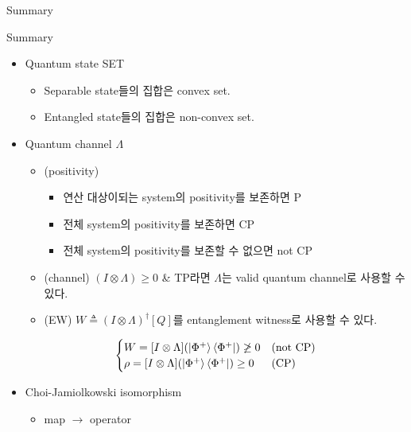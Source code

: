 \documentclass[9pt]{beamer}
\begin{document}
    \begin{frame}{Summary}
        \begin{block}{Summary}
            \begin{itemize}
                \item Quantum state SET 
                \begin{itemize}
                    \item Separable state들의 집합은 convex set.
                    \item Entangled state들의 집합은 non-convex set.
                \end{itemize}
                \item Quantum channel $\Lambda$
                \begin{itemize}
                    \item (positivity)
                    \begin{itemize}
                        \item 연산 대상이되는 system의 positivity를 보존하면 P
                        \item 전체 system의 positivity를 보존하면 CP
                        \item 전체 system의 positivity를 보존할 수 없으면 not CP
                    \end{itemize}
                    \item (channel) $(I \otimes \Lambda) \ge 0$ \& TP라면 $\Lambda$는 valid quantum channel로 사용할 수 있다.
                    \item (EW) $W \triangleq (I \otimes \Lambda)^\dagger [Q]$를 entanglement witness로 사용할 수 있다. 
                \end{itemize}
                \begin{equation*}
                    \begin{cases}
                        W = [I \otimes \Lambda] (\ket{\Phi^+} \bra{\Phi^+}) \not \ge 0 &\text{(not CP)} \\
                        \rho = [I \otimes \Lambda] (\ket{\Phi^+} \bra{\Phi^+}) \ge 0 &\text{(CP)}
                    \end{cases}
                \end{equation*}
            \item Choi-Jamiolkowski isomorphism
            \begin{itemize}
                \item map $\rightarrow$ operator

\end{itemize}
\end{itemize}
\end{block}
\end{frame}
\end{document}
